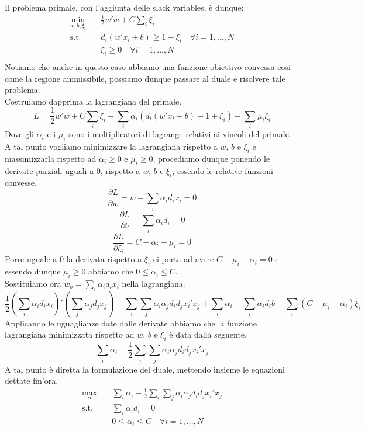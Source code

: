 \documentclass{article}
\begin{document}
Il problema primale, con l'aggiunta delle slack variables, è dunque:\\
\begin{equation}
\begin{aligned}
\min_{w, b, \xi_i} \quad & \frac{1}{2} w'w + C \sum_i \xi_i\\
\textrm{s.t.} \quad & d_i(w'x_i + b) \geq 1 - \xi_i \quad \forall i = 1, ..., N\\
  & \xi_i \geq 0 \quad \forall i = 1, ..., N\\
\end{aligned}
\end{equation}
Notiamo che anche in questo caso abbiamo una funzione obiettivo convessa cosi come la regione ammissibile, possiamo dunque passare al duale e risolvere tale problema.\\
Costruiamo dapprima la lagrangiana del primale.
\[ L = \frac{1}{2}w'w + C \sum_i \xi_i - \sum_i \alpha_i(d_i(w'x_i + b) - 1 + \xi_i) - \sum_i \mu_i \xi_i\]
Dove gli $\alpha_i$ e i $\mu_i$ sono i moltiplicatori di lagrange relativi ai vincoli del primale. A tal punto vogliamo minimizzare la lagrangiana rispetto a $w$, $b$ e $\xi_i$ e massimizzarla rispetto ad $\alpha_i \geq 0$ e $\mu_i \geq 0$, procediamo dunque ponendo le derivate parziali uguali a 0, rispetto a $w$, $b$ e $\xi_i$, essendo le relative funzioni convesse.
\[\frac{\partial L}{\partial w} = w - \sum_i \alpha_i d_i x_i = 0\]
\[\frac{\partial L}{\partial b} = \sum_i \alpha_i d_i = 0\]
\[\frac{\partial L}{\partial \xi_i} = C - \alpha_i - \mu_i = 0\]
Porre uguale a 0 la derivata rispetto a $\xi_i$ ci porta ad avere $C - \mu_i - \alpha_i = 0$ e essendo dunque $\mu_i \geq 0$ abbiamo che $0 \leq \alpha_i \leq C$.\\
Sostituiamo ora $w_o = \sum_i \alpha_i d_i x_i$ nella lagrangiana.\\
\[\frac{1}{2}(\sum_i \alpha_i d_i x_i)'(\sum_j \alpha_j d_j x_j) - \sum_i \sum_j \alpha_i \alpha_j d_i d_j x_i'x_j + \sum_i \alpha_i - \sum_i \alpha_i d_i b - \sum_i (C - \mu_i - \alpha_i) \xi_i\]
Applicando le uguaglianze date dalle derivate abbiamo che la funzione lagrangiana minimizzata rispetto ad $w$, $b$ e $\xi_i$ è data dalla seguente.
\[\sum_i \alpha_i - \frac{1}{2}\sum_i \sum_j \alpha_i \alpha_j d_i d_j x_i'x_j\]
A tal punto è diretta la formulazione del duale, mettendo insieme le equazioni dettate fin'ora.\\
\begin{equation}
\begin{aligned}
\max_{\alpha} \quad & \sum_i \alpha_i - \frac{1}{2}\sum_i \sum_j \alpha_i \alpha_j d_i d_j x_i'x_j\\
\textrm{s.t.} \quad & \sum_i \alpha_i d_i = 0\\
  & 0 \leq \alpha_i \leq C \quad \forall i = 1, ..., N\\
\end{aligned}
\end{equation}
\end{document}
